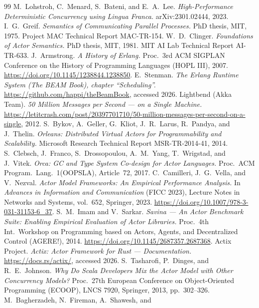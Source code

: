 \documentclass[11pt]{article}
\begin{document}
\begin{thebibliography}{99}
 M.~Lohstroh, C.~Menard, S.~Bateni, and E.~A.~Lee.
  \emph{High-Performance Deterministic Concurrency using Lingua Franca.}
  arXiv:2301.02444, 2023.
 I.~G.~Greif.
  \emph{Semantics of Communicating Parallel Processes.}
  PhD thesis, MIT, 1975. Project MAC Technical Report MAC-TR-154.
 W.~D.~Clinger.
  \emph{Foundations of Actor Semantics.}
  PhD thesis, MIT, 1981. MIT AI Lab Technical Report AI-TR-633.
 J.~Armstrong.
  \emph{A History of Erlang.}
  Proc.\ 3rd ACM SIGPLAN Conference on the History of Programming Languages
  (HOPL III), 2007. \url{https://doi.org/10.1145/1238844.1238850}.
 E.~Stenman.
  \emph{The Erlang Runtime System (The BEAM Book), chapter ``Scheduling''.}
  \url{https://github.com/happi/theBeamBook}, accessed 2026.
 Lightbend (Akka Team).
  \emph{50 Million Messages per Second --- on a Single Machine.}
  \url{https://letitcrash.com/post/20397701710/50-million-messages-per-second-on-a-single},
  2012.
 S.~Bykov, A.~Geller, G.~Kliot, J.~R.~Larus, R.~Pandya,
  and J.~Thelin.
  \emph{Orleans: Distributed Virtual Actors for Programmability and
  Scalability.} Microsoft Research Technical Report MSR-TR-2014-41, 2014.
 S.~Clebsch, J.~Franco, S.~Drossopoulou, A.~M.~Yang,
  T.~Wrigstad, and J.~Vitek.
  \emph{Orca: GC and Type System Co-design for Actor Languages.}
  Proc.\ ACM Program.\ Lang.\ 1(OOPSLA), Article~72, 2017.
 C.~Camilleri, J.~G.~Vella, and V.~Nezval.
  \emph{Actor Model Frameworks: An Empirical Performance Analysis.}
  In \emph{Advances in Information and Communication} (FICC 2023), Lecture Notes
  in Networks and Systems, vol.~652, Springer, 2023.
  \url{https://doi.org/10.1007/978-3-031-31153-6_37}.
 S.~M.~Imam and V.~Sarkar.
  \emph{Savina --- An Actor Benchmark Suite: Enabling Empirical Evaluation of
  Actor Libraries.} Proc.\ 4th Int.\ Workshop on Programming based on Actors,
  Agents, and Decentralized Control (AGERE!), 2014.
  \url{https://doi.org/10.1145/2687357.2687368}.
 Actix Project.
  \emph{Actix: Actor Framework for Rust --- Documentation.}
  \url{https://docs.rs/actix/}, accessed 2026.
 S.~Tasharofi, P.~Dinges, and R.~E.~Johnson.
  \emph{Why Do Scala Developers Mix the Actor Model with Other Concurrency
  Models?} Proc.\ 27th European Conference on Object-Oriented Programming
  (ECOOP), LNCS 7920, Springer, 2013, pp.~302--326.
 M.~Bagherzadeh, N.~Fireman, A.~Shawesh, and

\end{thebibliography}
\end{document}
